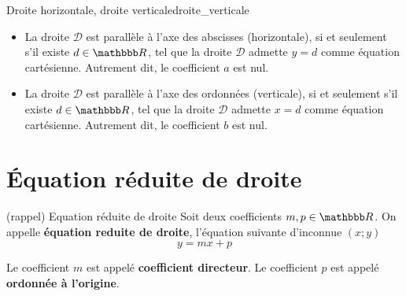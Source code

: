 \documentclass[10pt,a4paper,openany,twoside, prof]{book}
\begin{document}
\begin{prop}{Droite horizontale, droite verticale}{droite_verticale}
   \begin{itemize}
      \item
      La droite $\mathcal{D}$ est parallèle à l'axe des abscisses (horizontale), si et seulement s'il existe $d\in\R$, tel que la droite $\mathcal{D}$ admette $y=d$ comme équation cartésienne. Autrement dit, le coefficient $a$ est nul.
      \item
      La droite $\mathcal{D}$ est parallèle à l'axe des ordonnées (verticale), si et seulement s'il existe $d\in\R$, tel que la droite $\mathcal{D}$ admette $x=d$ comme équation cartésienne. Autrement dit, le coefficient $b$ est nul.
   \end{itemize}
   \begin{center}
   \end{center}
\end{prop}

\vspace{-5mm}
\section{Équation réduite de droite}

\begin{defi}{(rappel) Equation réduite de droite}{}
   Soit deux coefficients $m, p\in\R$. On appelle \textbf{équation reduite de droite}, l'équation suivante d'inconnue $(x;y)$
   $$y=mx+p$$

   Le coefficient $m$ est appelé \textbf{coefficient directeur}. Le coefficient $p$ est appelé \textbf{ordonnée à l'origine}.
\end{defi}
\end{document}
